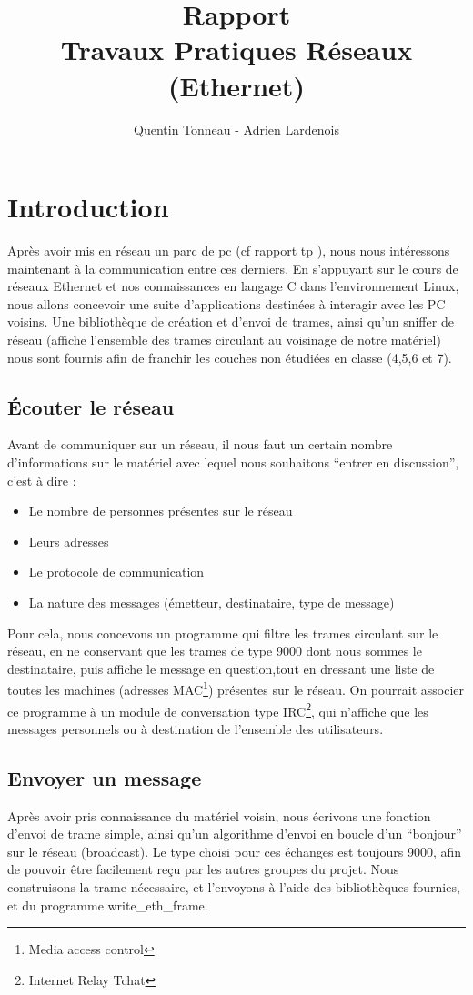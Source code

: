 \documentclass[a4paper,11pt]{article}
\title {Rapport \\ Travaux Pratiques Réseaux (Ethernet)}
\author {Quentin Tonneau - Adrien Lardenois}
\date{}
\begin{document}
	\maketitle %
	\tableofcontents %
	\newpage %
	
	
	
	
	
	
	\section{Introduction}
	Après avoir mis en réseau un parc de pc (cf rapport tp ), nous nous intéressons maintenant à la communication entre ces derniers. En s'appuyant sur le cours de réseaux Ethernet et nos connaissances en langage C dans l'environnement Linux, nous allons concevoir une suite d'applications destinées à interagir avec les PC voisins. Une bibliothèque de création et d'envoi de trames, ainsi qu'un sniffer de réseau (affiche l'ensemble des trames circulant au voisinage de notre matériel) nous sont fournis afin de franchir les couches non étudiées en classe (4,5,6 et 7).
	\subsection{Écouter le réseau}
	Avant de communiquer sur un réseau, il nous faut un certain nombre d'informations sur le matériel avec lequel nous souhaitons ``entrer en discussion'', c'est à dire :
	\begin{itemize}
		\item Le nombre de personnes présentes sur le réseau
		\item Leurs adresses
		\item Le protocole de communication
		\item La nature des messages (émetteur, destinataire, type de message)
	\end{itemize}
	Pour cela, nous concevons un programme qui filtre les trames circulant sur le réseau, en ne conservant que les trames de type 9000 dont nous sommes le destinataire, puis affiche le message en question,tout en dressant une liste de toutes les machines (adresses MAC\footnote{Media access control}) présentes sur le réseau. On pourrait associer ce programme à un module de conversation type IRC\footnote{Internet Relay Tchat}, qui n'affiche que les messages personnels ou à destination de l'ensemble des utilisateurs.
	\subsection{Envoyer un message}
	Après avoir pris connaissance du matériel voisin, nous écrivons une fonction d'envoi de trame simple, ainsi qu'un algorithme d'envoi en boucle d'un ``bonjour'' sur le réseau (broadcast). Le type choisi pour ces échanges est toujours 9000, afin de pouvoir être facilement reçu par les autres groupes du projet. Nous construisons la trame nécessaire, et l'envoyons à l'aide des bibliothèques fournies, et du programme write\_eth\_frame.
\end{document}
